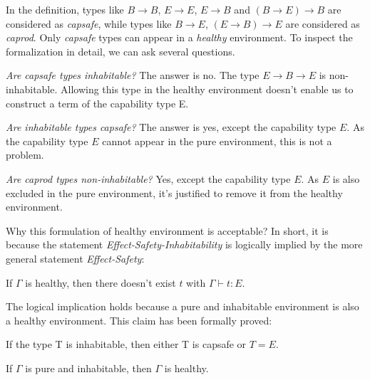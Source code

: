 In the definition, types like $B \to B$, $E \to E$, $E \to B$ and
$(B \to E) \to B$ are considered as \emph{capsafe}, while types like
$B \to E$, $(E \to B) \to E$ are considered as \emph{caprod}. Only
\emph{capsafe} types can appear in a \emph{healthy} environment. To
inspect the formalization in detail, we can ask several questions.

\emph{Are capsafe types inhabitable?} The answer is no. The type
$E \to B \to E$ is non-inhabitable. Allowing this type in the healthy
environment doesn't enable us to construct a term of the capability
type E.

\emph{Are inhabitable types capsafe?} The answer is yes, except the
capability type $E$. As the capability type $E$ cannot appear in the
pure environment, this is not a problem.

\emph{Are caprod types non-inhabitable?} Yes, except the capability
type $E$. As $E$ is also excluded in the pure environment, it's
justified to remove it from the healthy environment.


Why this formulation of healthy environment is acceptable? In short,
it is because the statement \emph{Effect-Safety-Inhabitability} is
logically implied by the more general statement \emph{Effect-Safety}:

\begin{definition}
  If $\Gamma$ is healthy, then there doesn't exist $t$ with
  $\Gamma \vdash t : E$.
\end{definition}

The logical implication holds because a pure and inhabitable
environment is also a healthy environment. This claim has been
formally proved:

\begin{lemma}
  If the type T is inhabitable, then either T is capsafe or $T = E$.
\end{lemma}

\begin{theorem}
  If $\Gamma$ is pure and inhabitable, then $\Gamma$ is healthy.
\end{theorem}

